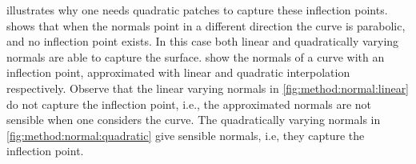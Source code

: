 	 illustrates why one needs quadratic patches to capture these inflection points.  shows that when the normals point in a different direction the curve is parabolic, and no inflection point exists. In this case both linear and quadratically varying normals are able to capture the surface.  show the normals of a curve with an inflection point, approximated with linear and quadratic interpolation respectively. Observe that the linear varying normals in \cref{fig:method:normal:linear} do not capture the inflection point, i.e., the approximated normals are not sensible when one considers the curve. The quadratically varying normals in \cref{fig:method:normal:quadratic} give sensible normals, i.e, they capture the inflection point.

